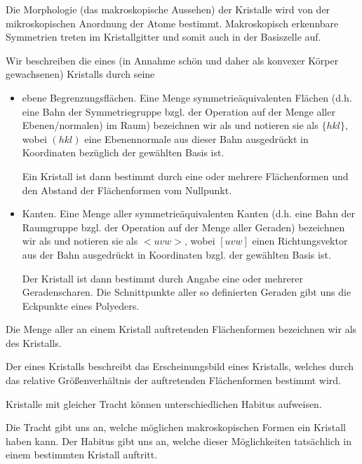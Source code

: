

Die Morphologie (das makroskopische Aussehen) der Kristalle wird von der mikroskopischen Anordnung der Atome bestimmt. Makroskopisch erkennbare Symmetrien treten im Kristallgitter und somit auch in der Basiszelle auf.

\begin{definition}
Wir beschreiben die  eines (in Annahme schön und daher als konvexer Körper gewachsenen) Kristalls durch seine
\begin{itemize}
	\item ebene Begrenzungsflächen. Eine Menge symmetrieäquivalenten Flächen (d.h. eine Bahn der Symmetriegruppe bzgl. der Operation auf der Menge aller Ebenen/normalen) im Raum) bezeichnen wir als  und notieren sie als $\{hkl\}$, wobei $(hkl)$ eine Ebenennormale aus dieser Bahn ausgedrückt in Koordinaten bezüglich der gewählten Basis ist.
	
	Ein Kristall ist dann bestimmt durch eine oder mehrere Flächenformen und den Abstand der Flächenformen vom Nullpunkt.
	\item Kanten. Eine Menge aller symmetrieäquivalenten Kanten (d.h. eine Bahn der Raumgruppe bzgl. der Operation auf der Menge aller Geraden) bezeichnen wir als  und notieren sie als $<uvw>$, wobei $[uvw]$ einen Richtungsvektor aus der Bahn ausgedrückt in Koordinaten bzgl. der gewählten Basis ist.
	
	Der Kristall ist dann bestimmt durch Angabe eine oder mehrerer Geradenscharen. Die Schnittpunkte aller so definierten Geraden gibt uns die Eckpunkte eines Polyeders.
\end{itemize}
\end{definition}

\begin{definition}
Die Menge aller an einem Kristall auftretenden Flächenformen bezeichnen wir als  des Kristalls.
\end{definition}

\begin{definition}
Der  eines Kristalls beschreibt das Erscheinungsbild eines Kristalls, welches durch das  relative Größenverhältnis der auftretenden Flächenformen bestimmt wird. 
\end{definition}

\begin{remark}
Kristalle mit gleicher Tracht können unterschiedlichen Habitus aufweisen.

Die Tracht gibt uns an, welche möglichen makroskopischen Formen ein Kristall haben kann. Der Habitus gibt uns an, welche dieser Möglichkeiten tatsächlich in einem bestimmten Kristall auftritt.
\end{remark}

